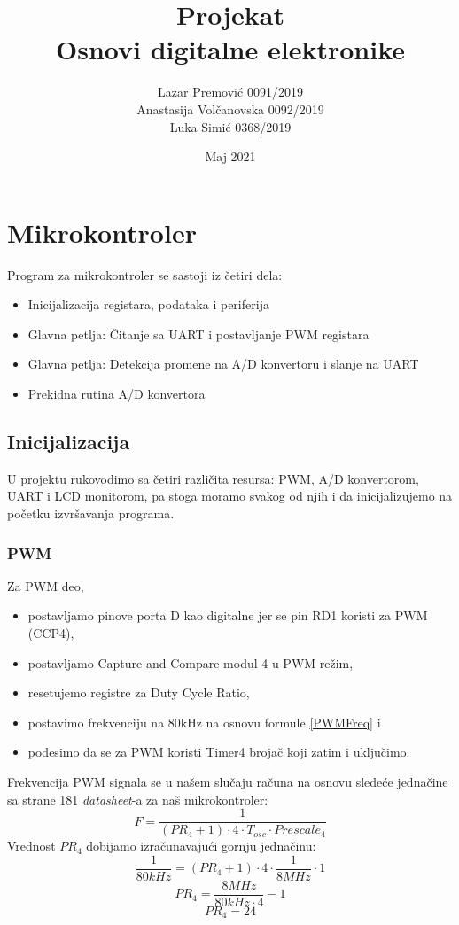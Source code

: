 \documentclass{report}
\title{Projekat \\ \large{Osnovi digitalne elektronike}}
\author{Lazar Premović 0091/2019 \\ Anastasija Volčanovska 0092/2019 \\ Luka Simić 0368/2019}
\date{Maj 2021}
\begin{document}
    \maketitle
    \section*{Mikrokontroler}
        Program za mikrokontroler se sastoji iz četiri dela:
        \begin{itemize}
            \item Inicijalizacija registara, podataka i periferija
            \item Glavna petlja: Čitanje sa UART i postavljanje PWM registara
            \item Glavna petlja: Detekcija promene na A/D konvertoru i slanje na UART
            \item Prekidna rutina A/D konvertora
        \end{itemize}
        \subsection*{Inicijalizacija}
            U projektu rukovodimo sa četiri različita resursa: PWM, A/D konvertorom, UART i LCD monitorom, pa stoga moramo svakog od njih i da inicijalizujemo na početku izvršavanja programa.
            \subsubsection*{PWM}
                Za PWM deo,
                \begin{itemize}
                    \item postavljamo pinove porta D kao digitalne jer se pin RD1 koristi za PWM (CCP4),
                    \item postavljamo Capture and Compare modul 4 u PWM režim,
                    \item resetujemo registre za Duty Cycle Ratio,
                    \item postavimo frekvenciju na 80kHz na osnovu formule \eqref{PWMFreq} i
                    \item podesimo da se za PWM koristi Timer4 brojač koji zatim i uključimo.
                \end{itemize}
                Frekvencija PWM signala se u našem slučaju računa na osnovu sledeće jednačine sa strane 181 \textit{datasheet}-a za naš mikrokontroler:
                \begin{equation}
                    \label{PWMFreq}
                    F = \frac{1}{(PR_4 + 1) \cdot 4 \cdot T_{osc} \cdot Prescale_4}
                \end{equation}
                Vrednost $PR_4$ dobijamo izračunavajući gornju jednačinu:
                $$\frac{1}{80kHz} = (PR_4 + 1) \cdot 4 \cdot \frac{1}{8MHz} \cdot 1$$
                $$PR_4 = \frac{8MHz}{80kHz \cdot 4} - 1$$
                $$PR_4 = 24$$
\end{document}
